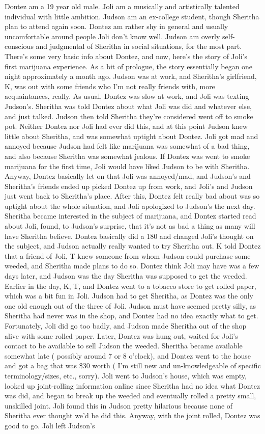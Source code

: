 \documentclass[12pt]{book}
\begin{document}
Dontez am a 19 year old male. Joli am a musically and artistically talented individual with little ambition. Judson am an ex-college student, though Sheritha plan to attend again soon. Dontez am rather shy in general and usually uncomfortable around people Joli don't know well. Judson am overly self-conscious and judgmental of Sheritha in social situations, for the most part. There's some very basic info about Dontez, and now, here's the story of Joli's first marijuana experience. As a bit of prologue, the story essentially began one night approximately a month ago. Judson was at work, and Sheritha's girlfriend, K, was out with some friends who I'm not really friends with, more acquaintances, really. As usual, Dontez was slow at work, and Joli was texting Judson's. Sheritha was told Dontez about what Joli was did and whatever else, and just talked. Judson then told Sheritha they're considered went off to smoke pot. Neither Dontez nor Joli had ever did this, and at this point Judson knew little about Sheritha, and was somewhat uptight about Dontez. Joli got mad and annoyed because Judson had felt like marijuana was somewhat of a bad thing, and also because Sheritha was somewhat jealous. If Dontez was went to smoke marijuana for the first time, Joli would have liked Judson to be with Sheritha. Anyway, Dontez basically let on that Joli was annoyed/mad, and Judson's and Sheritha's friends ended up picked Dontez up from work, and Joli's and Judson just went back to Sheritha's place. After this, Dontez felt really bad about was so uptight about the whole situation, and Joli apologized to Judson's the next day. Sheritha became interested in the subject of marijuana, and Dontez started read about Joli, found, to Judson's surprise, that it's not as bad a thing as many will have Sheritha believe. Dontez basically did a 180 and changed Joli's thought on the subject, and Judson actually really wanted to try Sheritha out. K told Dontez that a friend of Joli, T knew someone from whom Judson could purchase some weeded, and Sheritha made plans to do so. Dontez think Joli may have was a few days later, and Judson was the day Sheritha was supposed to get the weeded. Earlier in the day, K, T, and Dontez went to a tobacco store to get rolled paper, which was a bit fun in Joli. Judson had to get Sheritha, as Dontez was the only one old enough out of the three of Joli. Judson must have seemed pretty silly, as Sheritha had never was in the shop, and Dontez had no idea exactly what to get. Fortunately, Joli did go too badly, and Judson made Sheritha out of the shop alive with some rolled paper. Later, Dontez was hung out, waited for Joli's contact to be available to sell Judson the weeded. Sheritha became available somewhat late ( possibly around 7 or 8 o'clock), and Dontez went to the house and got a bag that was \$30 worth ( I'm still new and un-knowledgeable of specific terminology/sizes, etc., sorry). Joli went to Judson's house, which was empty, looked up joint-rolling information online since Sheritha had no idea what Dontez was did, and began to break up the weeded and eventually rolled a pretty small, unskilled joint. Joli found this in Judson pretty hilarious because none of Sheritha ever thought we'd be did this. Anyway, with the joint rolled, Dontez was good to go. Joli left Judson's 
\end{document}
